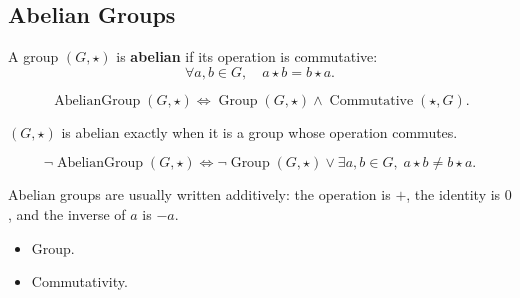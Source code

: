 \subsection{Abelian Groups}
\label{subsec:abelian-groups}

\begin{tcolorbox}[title={Definition --- Abelian Group}]
\begin{definition}
\label{def:abelian-group}
A group $(G,\star)$ is \textbf{abelian} if its operation is commutative:
\[
\forall a,b \in G,\quad a\star b=b\star a.
\]
\end{definition}
\end{tcolorbox}

\begin{remark*}
\[
\operatorname{AbelianGroup}(G,\star)
\Longleftrightarrow
\operatorname{Group}(G,\star)
\land
\operatorname{Commutative}(\star,G).
\]
\end{remark*}

\begin{remark*}
$(G,\star)$ is abelian exactly when it is a group whose operation commutes.
\end{remark*}

\begin{remark*}
\[
\neg\operatorname{AbelianGroup}(G,\star)
\Longleftrightarrow
\neg\operatorname{Group}(G,\star)
\lor
\exists a,b\in G,\; a\star b\neq b\star a.
\]
\end{remark*}

\begin{remark*}[Interpretation]
Abelian groups are usually written additively: the operation is $+$, the
identity is $0$, and the inverse of $a$ is $-a$.
\end{remark*}

\begin{remark*}[Dependencies]
\begin{itemize}
  \item Group.
  \item Commutativity.
\end{itemize}
\end{remark*}
